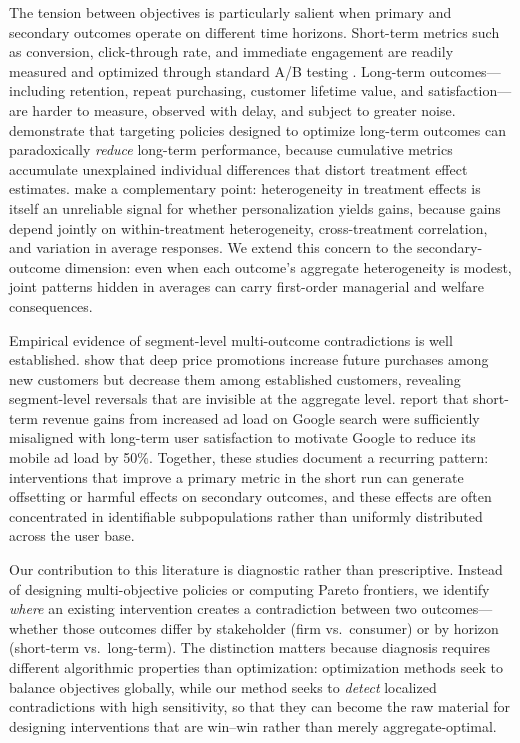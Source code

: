 \documentclass[11pt,letterpaper,english]{article}
\theoremstyle{definition}
\theoremstyle{definition}
\begin{document}
\begin{bibunit}
The tension between objectives is particularly salient when primary and secondary outcomes operate on different time horizons. Short-term metrics such as conversion, click-through rate, and immediate engagement are readily measured and optimized through standard A/B testing \citep{kohavi2012trustworthy, feit2019testandroll}. Long-term outcomes---including retention, repeat purchasing, customer lifetime value, and satisfaction---are harder to measure, observed with delay, and subject to greater noise. \citet{ascarza2024doingmore} demonstrate that targeting policies designed to optimize long-term outcomes can paradoxically \emph{reduce} long-term performance, because cumulative metrics accumulate unexplained individual differences that distort treatment effect estimates. \citet{shchetkina2024actionable} make a complementary point: heterogeneity in treatment effects is itself an unreliable signal for whether personalization yields gains, because gains depend jointly on within-treatment heterogeneity, cross-treatment correlation, and variation in average responses. We extend this concern to the secondary-outcome dimension: even when each outcome's aggregate heterogeneity is modest, joint patterns hidden in averages can carry first-order managerial and welfare consequences.

Empirical evidence of segment-level multi-outcome contradictions is well established. \citet{anderson2004longrun} show that deep price promotions increase future purchases among new customers but decrease them among established customers, revealing segment-level reversals that are invisible at the aggregate level. \citet{hohnhold2015focusing} report that short-term revenue gains from increased ad load on Google search were sufficiently misaligned with long-term user satisfaction to motivate Google to reduce its mobile ad load by 50\%. Together, these studies document a recurring pattern: interventions that improve a primary metric in the short run can generate offsetting or harmful effects on secondary outcomes, and these effects are often concentrated in identifiable subpopulations rather than uniformly distributed across the user base.

Our contribution to this literature is diagnostic rather than prescriptive. Instead of designing multi-objective policies or computing Pareto frontiers, we identify \emph{where} an existing intervention creates a contradiction between two outcomes---whether those outcomes differ by stakeholder (firm vs.\ consumer) or by horizon (short-term vs.\ long-term). The distinction matters because diagnosis requires different algorithmic properties than optimization: optimization methods seek to balance objectives globally, while our method seeks to \emph{detect} localized contradictions with high sensitivity, so that they can become the raw material for designing interventions that are win--win rather than merely aggregate-optimal.


\end{bibunit}
\end{document}
